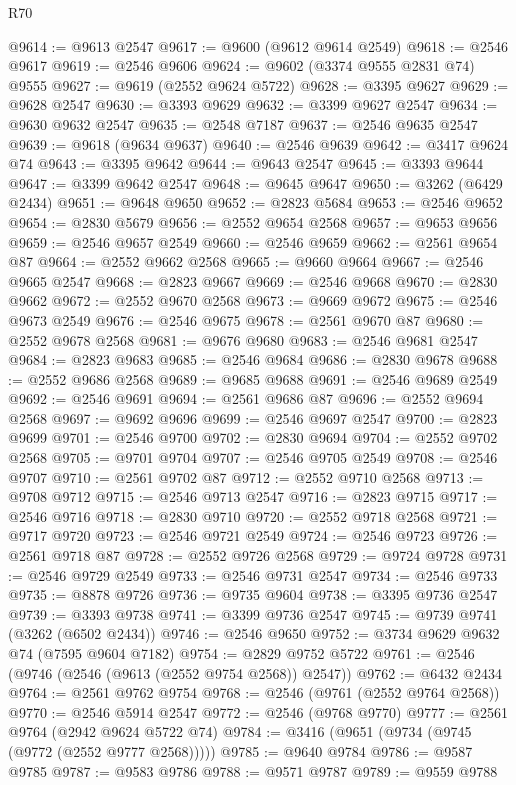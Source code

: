 \begin{lexlean}{R70}
\begin{coremodule}
@9614 := @9613 @2547
@9617 := @9600 (@9612 @9614 @2549)
@9618 := @2546 @9617
@9619 := @2546 @9606
@9624 := @9602 (@3374 @9555 @2831 @74) @9555
@9627 := @9619 (@2552 @9624 @5722)
@9628 := @3395 @9627
@9629 := @9628 @2547
@9630 := @3393 @9629
@9632 := @3399 @9627 @2547
@9634 := @9630 @9632 @2547
@9635 := @2548 @7187
@9637 := @2546 @9635 @2547
@9639 := @9618 (@9634 @9637)
@9640 := @2546 @9639
@9642 := @3417 @9624 @74
@9643 := @3395 @9642
@9644 := @9643 @2547
@9645 := @3393 @9644
@9647 := @3399 @9642 @2547
@9648 := @9645 @9647
@9650 := @3262 (@6429 @2434)
@9651 := @9648 @9650
@9652 := @2823 @5684
@9653 := @2546 @9652
@9654 := @2830 @5679
@9656 := @2552 @9654 @2568
@9657 := @9653 @9656
@9659 := @2546 @9657 @2549
@9660 := @2546 @9659
@9662 := @2561 @9654 @87
@9664 := @2552 @9662 @2568
@9665 := @9660 @9664
@9667 := @2546 @9665 @2547
@9668 := @2823 @9667
@9669 := @2546 @9668
@9670 := @2830 @9662
@9672 := @2552 @9670 @2568
@9673 := @9669 @9672
@9675 := @2546 @9673 @2549
@9676 := @2546 @9675
@9678 := @2561 @9670 @87
@9680 := @2552 @9678 @2568
@9681 := @9676 @9680
@9683 := @2546 @9681 @2547
@9684 := @2823 @9683
@9685 := @2546 @9684
@9686 := @2830 @9678
@9688 := @2552 @9686 @2568
@9689 := @9685 @9688
@9691 := @2546 @9689 @2549
@9692 := @2546 @9691
@9694 := @2561 @9686 @87
@9696 := @2552 @9694 @2568
@9697 := @9692 @9696
@9699 := @2546 @9697 @2547
@9700 := @2823 @9699
@9701 := @2546 @9700
@9702 := @2830 @9694
@9704 := @2552 @9702 @2568
@9705 := @9701 @9704
@9707 := @2546 @9705 @2549
@9708 := @2546 @9707
@9710 := @2561 @9702 @87
@9712 := @2552 @9710 @2568
@9713 := @9708 @9712
@9715 := @2546 @9713 @2547
@9716 := @2823 @9715
@9717 := @2546 @9716
@9718 := @2830 @9710
@9720 := @2552 @9718 @2568
@9721 := @9717 @9720
@9723 := @2546 @9721 @2549
@9724 := @2546 @9723
@9726 := @2561 @9718 @87
@9728 := @2552 @9726 @2568
@9729 := @9724 @9728
@9731 := @2546 @9729 @2549
@9733 := @2546 @9731 @2547
@9734 := @2546 @9733
@9735 := @8878 @9726
@9736 := @9735 @9604
@9738 := @3395 @9736 @2547
@9739 := @3393 @9738
@9741 := @3399 @9736 @2547
@9745 := @9739 @9741 (@3262 (@6502 @2434))
@9746 := @2546 @9650
@9752 := @3734 @9629 @9632 @74 (@7595 @9604 @7182)
@9754 := @2829 @9752 @5722
@9761 := @2546 (@9746 (@2546 (@9613 (@2552 @9754 @2568)) @2547))
@9762 := @6432 @2434
@9764 := @2561 @9762 @9754
@9768 := @2546 (@9761 (@2552 @9764 @2568))
@9770 := @2546 @5914 @2547
@9772 := @2546 (@9768 @9770)
@9777 := @2561 @9764 (@2942 @9624 @5722 @74)
@9784 := @3416 (@9651 (@9734 (@9745 (@9772 (@2552 @9777 @2568)))))
@9785 := @9640 @9784
@9786 := @9587 @9785
@9787 := @9583 @9786
@9788 := @9571 @9787
@9789 := @9559 @9788

\end{coremodule}
\end{lexlean}
